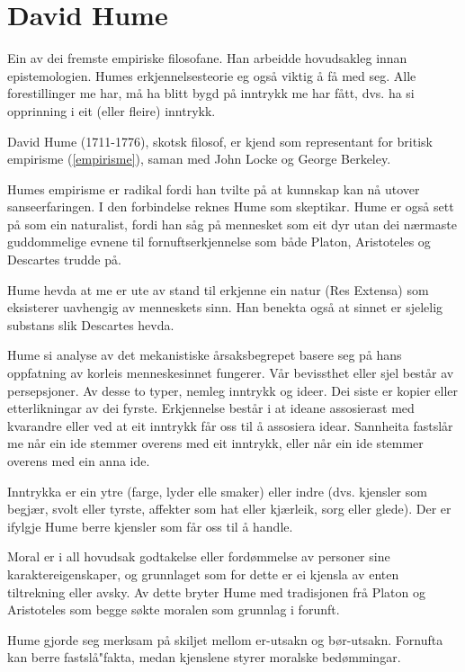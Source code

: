 \documentclass[a4paper]{IEEEtran}
\begin{document}
\section{David Hume}
\label{hume}\bigskip

Ein av dei fremste empiriske filosofane. Han arbeidde hovudsakleg innan epistemologien. Humes erkjennelsesteorie eg også viktig å få med seg. Alle forestillinger me har, må ha blitt bygd på inntrykk me har fått, dvs. ha si opprinning i eit (eller fleire) inntrykk.
\bigskip

David Hume (1711-1776), skotsk filosof, er kjend som representant for britisk empirisme (\ref{empirisme}), saman med John Locke og George Berkeley.\bigskip

Humes empirisme er radikal fordi han tvilte på at kunnskap kan nå utover sanseerfaringen. I den forbindelse reknes Hume som skeptikar. Hume er også sett på som ein naturalist, fordi han såg på mennesket som eit dyr utan dei nærmaste guddommelige evnene til fornuftserkjennelse som både Platon, Aristoteles og Descartes trudde på.\bigskip

Hume hevda at me er ute av stand til erkjenne ein natur (Res Extensa) som eksisterer uavhengig av menneskets sinn. Han benekta også at sinnet er sjelelig substans slik Descartes hevda. \bigskip

Hume si analyse av det mekanistiske årsaksbegrepet basere seg på hans oppfatning av korleis menneskesinnet fungerer. Vår bevissthet eller sjel består av persepsjoner. Av desse to typer, nemleg inntrykk og ideer. Dei siste er kopier eller etterlikningar av dei fyrste. Erkjennelse består i at ideane assosierast med kvarandre eller ved at eit inntrykk får oss til å assosiera idear. Sannheita fastslår me når ein ide stemmer overens med eit inntrykk, eller når ein ide stemmer overens med ein anna ide.\bigskip

Inntrykka er ein ytre (farge, lyder elle smaker) eller indre (dvs. kjensler som begjær, svolt eller tyrste, affekter som hat eller kjærleik, sorg eller glede). Der er ifylgje Hume berre kjensler som får oss til å handle.\bigskip

Moral er i all hovudsak godtakelse eller fordømmelse av personer sine karaktereigenskaper, og grunnlaget som for dette er ei kjensla av enten tiltrekning eller avsky. Av dette bryter Hume med tradisjonen frå Platon og Aristoteles som begge søkte moralen som grunnlag i forunft.\bigskip

Hume gjorde seg merksam på skiljet mellom er-utsakn og bør-utsakn. Fornufta kan berre fastslå"fakta, medan kjenslene styrer moralske bedømmingar.\bigskip
\end{document}
